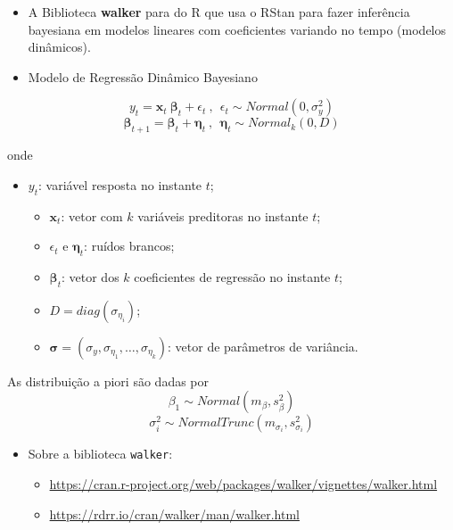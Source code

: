 \documentclass[
]{book}
\providecommand{\tightlist}{%
  \setlength{\itemsep}{0pt}\setlength{\parskip}{0pt}}
\begin{document}
\begin{itemize}
\item
  A Biblioteca \textbf{walker} para do R que usa o RStan para fazer inferência bayesiana em modelos lineares com coeficientes variando no tempo (modelos dinâmicos).
\item
  Modelo de Regressão Dinâmico Bayesiano
\end{itemize}

\[y_t = \boldsymbol x_t~\boldsymbol\beta_t + \epsilon_t ~,~~ \epsilon_t \sim \textit{Normal}(0,\sigma_y^2)\]
\[\boldsymbol\beta_{t+1} = \boldsymbol\beta_t + \boldsymbol\eta_t ~,~~ \boldsymbol\eta_t \sim \textit{Normal}_k(0,D)\]

onde

\begin{itemize}
\item
  \(y_t\): variável resposta no instante \(t\);

  \begin{itemize}
  \item
    \(\boldsymbol x_t\): vetor com \(k\) variáveis preditoras no instante \(t\);
  \item
    \(\epsilon_t\) e \(\boldsymbol\eta_t\): ruídos brancos;
  \item
    \(\boldsymbol\beta_t\): vetor dos \(k\) coeficientes de regressão no instante \(t\);
  \item
    \(D=\textit{diag}({\sigma}_{\eta_i})\);
  \item
    \(\boldsymbol\sigma=\left(\sigma_y,{\sigma}_{\eta_1},\ldots,{\sigma}_{\eta_k}\right)\): vetor de parâmetros de variância.
  \end{itemize}
\end{itemize}

As distribuição a piori são dadas por
\[\beta_1 \sim \textit{Normal}(m_\beta,{s}_\beta^2)\]
\[\sigma_i^2 \sim \textit{NormalTrunc}({m}_{\sigma_i},{s}_{\sigma_i}^2)\]

\begin{itemize}
\tightlist
\item
  Sobre a biblioteca \texttt{walker}:

  \begin{itemize}
  \tightlist
  \item
    \url{https://cran.r-project.org/web/packages/walker/vignettes/walker.html}
  \item
    \url{https://rdrr.io/cran/walker/man/walker.html}
  \end{itemize}
\end{itemize}
\end{document}

